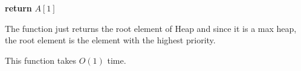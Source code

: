 \begin{algorithm}[H]
 \begin{algorithmic}[1]
    
        \State
        \textbf{return} $A[1]$
    \EndFunction
         \end{algorithmic}
\end{algorithm}

The function just returns the root element of Heap and since it is 
a max heap, the root element is the element with the highest priority.

This function takes $O(1)$ time.